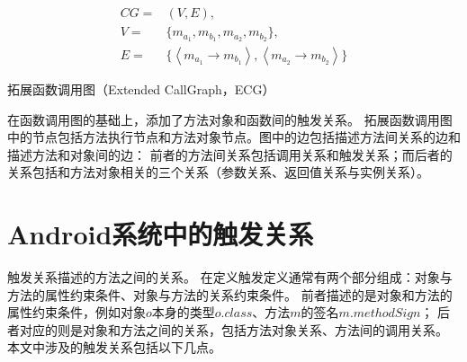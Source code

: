 \begin{equation}
\begin{aligned}
CG = &(V,E) ,\\ 
V = & \{m_{a_{1}},m_{b_{1}},m_{a_{2}},m_{b_{2}}\}, \\ 
E = & \{  
\left\langle  m_{a_{1}} \to m_{b_{1}} \right\rangle  ,\left\langle  m_{a_{2}} \to m_{b_{2}}\right\rangle 
\} 
\end{aligned}
\label{equ:dcg_sample} 
\end{equation}



\begin{Def}
	拓展函数调用图（Extended CallGraph，ECG）
\end{Def}


	在函数调用图的基础上，添加了方法对象和函数间的触发关系。
	拓展函数调用图中的节点包括方法执行节点和方法对象节点。图中的边包括描述方法间关系的边和描述方法和对象间的边：
	前者的方法间关系包括调用关系和触发关系；而后者的关系包括和方法对象相关的三个关系（参数关系、返回值关系与实例关系）。
	
	
	
\section{Android系统中的触发关系}

触发关系描述的方法之间的关系。
在定义触发定义通常有两个部分组成：对象与方法的属性约束条件、对象与方法的关系约束条件。
前者描述的是对象和方法的属性约束条件，例如对象$o$本身的类型$o.class$、方法$m$的签名$m.methodSign$；
后者对应的则是对象和方法之间的关系，包括方法对象关系、方法间的调用关系。
本文中涉及的触发关系包括以下几点。


